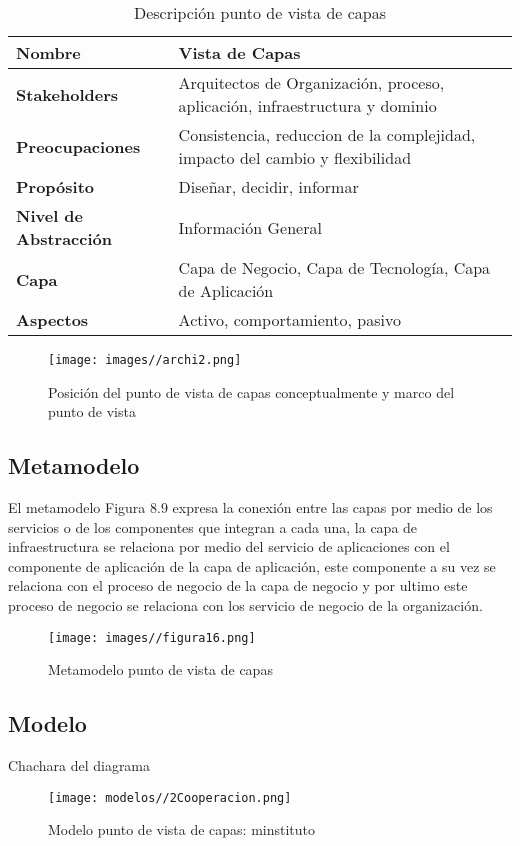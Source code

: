   \begin{table}[!h]
  	\centering
   	\begin{tabular}{lp{8cm}}
   		\toprule
   		\textbf{Nombre} & \textbf{Vista de Capas} \\
   		\midrule
   		\textbf{Stakeholders} & Arquitectos de Organización, proceso, aplicación, infraestructura y dominio \\
   		\textbf{Preocupaciones} & Consistencia, reduccion de la complejidad, impacto del cambio y flexibilidad \\
   		\textbf{Propósito} & Diseñar, decidir, informar \\
   		\textbf{Nivel de Abstracción} & Información General \\
   		\textbf{Capa} & Capa de Negocio, Capa de Tecnología, Capa de Aplicación \\
   		\textbf{Aspectos} & Activo, comportamiento, pasivo \\
   		\bottomrule
   	\end{tabular}
   	\captionsetup{width=.95\textwidth}
   	\caption{Descripción punto de vista de capas}
   	\label{tabla19}
  \end{table}
    
  \begin{figure}[H]
   	\centering
   	\texttt{[image: images//archi2.png]}
   	\captionsetup{width=.95\textwidth}
   	\caption{Posición del punto de vista de capas conceptualmente y marco del punto de vista}
   	\label{Fig:figura28}
   \end{figure}
   
   \subsection{Metamodelo}
   El metamodelo Figura 8.9 expresa la conexión entre las capas por medio de los servicios o de los componentes que integran a cada una, la capa de infraestructura se relaciona por medio del servicio de aplicaciones con el componente de aplicación de la capa de aplicación, este componente a su vez se relaciona con el proceso de negocio de la capa de negocio y por ultimo este proceso de negocio se relaciona con los servicio de negocio de la organización.
  
   \begin{figure}[H]
   	\centering
   	\texttt{[image: images//figura16.png]}
   	\captionsetup{width=.95\textwidth}
   	\caption{Metamodelo punto de vista de capas}
   	\label{Fig:figura29}
   \end{figure}
   
   \subsection{Modelo}Chachara del diagrama
   \begin{figure}[H]
   	\centering
   	\texttt{[image: modelos//2Cooperacion.png]}
   	\captionsetup{width=.95\textwidth}
   	\caption{Modelo punto de vista de capas: minstituto}
   	\label{Fig:modelo16}
   \end{figure}